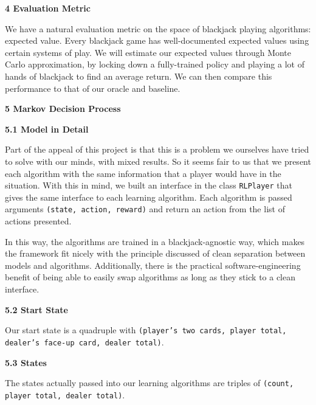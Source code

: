 \documentclass[12pt]{article}
\begin{document}
    {\large \textbf{4 Evaluation Metric}} \newline 
    
    We have a natural evaluation metric on the space of blackjack playing algorithms: expected value. Every blackjack game has well-documented expected values using certain systems of play. We will estimate our expected values through Monte Carlo approximation, by locking down a fully-trained policy and playing a lot of hands of blackjack to find an average return. We can then compare this performance to that of our oracle and baseline. \newline 
    
    {\large \textbf{5 Markov Decision Process}} \newline 
    
    \textbf{5.1 Model in Detail} \newline 
    
    Part of the appeal of this project is that this is a problem we ourselves have tried to solve with our minds, with mixed results. So it seems fair to us that we present each algorithm with the same information that a player would have in the situation. With this in mind, we built an interface in the class \texttt{RLPlayer} that gives the same interface to each learning algorithm. Each algorithm is passed arguments \texttt{(state, action, reward)} and return an action from the list of actions presented. \newline 
    
    In this way, the algorithms are trained in a blackjack-agnostic way, which makes the framework fit nicely with the principle discussed of clean separation between models and algorithms. Additionally, there is the practical software-engineering benefit of being able to easily swap algorithms as long as they stick to a clean interface. \newline 
    
    \textbf{5.2 Start State} \newline 
    
    Our start state is a quadruple with \texttt{(player's two cards, player total, dealer's face-up card, dealer total)}. \pagebreak 
    
    \textbf{5.3 States} \newline 
    
    The states actually passed into our learning algorithms are triples of \texttt{(count, player total, dealer total)}. \newline
    
\end{document}
